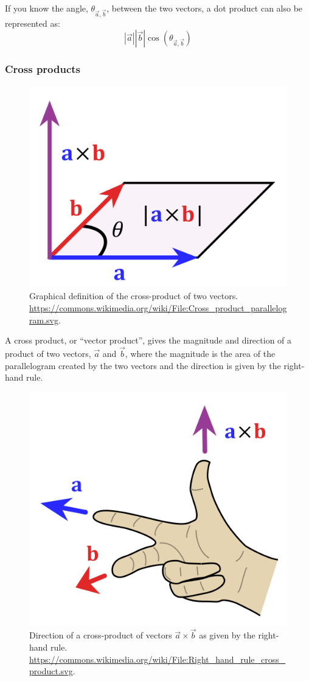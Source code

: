 \documentclass[a4paper,10pt]{scrartcl}
\begin{document}
If you know the angle, $\theta_{\vec{a},\vec{b}}$, between the two vectors, a dot product can also be represented as:
\begin{equation}
 \left| \vec{a} \right|  \left| \vec{b} \right| \cos{ \left( \theta_{\vec{a},\vec{b}} \right) }
\end{equation}


\subsubsection{Cross products}

\begin{figure}[ht!]
\begin{center}
 \includegraphics[width=.5\linewidth]{figures/NumericalAndMath/1280px-Cross_product_parallelogram.png}
\end{center}
 \caption{Graphical definition of the cross-product of two vectors. \url{https://commons.wikimedia.org/wiki/File:Cross_product_parallelogram.svg}.}
\end{figure}

A cross product, or ``vector product'', gives the magnitude and direction of a product of two vectors, $\vec{a}$ and $\vec{b}$, where the magnitude is the area of the parallelogram created by the two vectors and the direction is given by the right-hand rule. 

\begin{figure}[ht!]
\begin{center}
 \includegraphics[width=.5\linewidth]{figures/NumericalAndMath/507px-Right_hand_rule_cross_product.png}
\end{center}
 \caption{Direction of a cross-product of vectors $\vec{a} \times \vec{b}$ as given by the right-hand rule. \url{https://commons.wikimedia.org/wiki/File:Right_hand_rule_cross_product.svg}.}
\end{figure}
\end{document}
